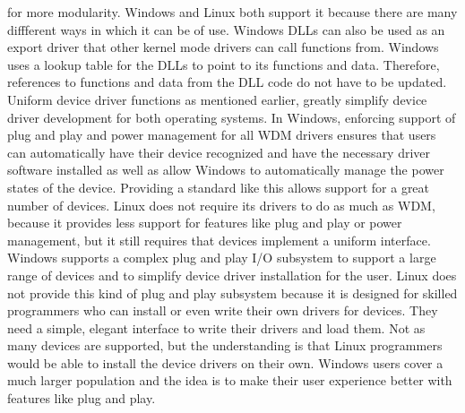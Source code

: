 \documentclass[letterpaper,10pt,titlepage]{article}
\begin{document}
for more modularity. Windows and Linux both support it because there are many
diffferent ways in which it can be of use. Windows DLLs can also be used 
as an export driver that other kernel mode drivers can call functions from.
Windows uses a lookup table for the DLLs to point to its functions and data.
Therefore, references to functions and data from the DLL code do not have
to be updated. 
\\
\linebreak
Uniform device driver functions as mentioned earlier, greatly simplify 
device driver development for both operating systems. In Windows, enforcing
support of plug and play and power management for all WDM drivers ensures 
that users can automatically have their device recognized and have the 
necessary driver software installed as well as allow Windows to 
automatically manage the power states of the device. Providing a standard 
like this allows support for a great number of devices. Linux does not
require its drivers to do as much as WDM, because it provides less support for
features like plug and play or power management, but it still requires 
that devices implement a uniform interface.
\\
\linebreak
Windows supports a complex plug and play I/O subsystem to support a large 
range of devices and to simplify device driver installation for the user. 
Linux does not provide this kind of plug and play subsystem because it is 
designed for skilled programmers who can install or even write their own 
drivers for devices. They need a simple, elegant interface to write their 
drivers and load them. Not as many devices are supported, but the understanding
is that Linux programmers would be able to install the device drivers on their
own. Windows users cover a much larger population and the idea is to make
their user experience better with features like plug and play.

%
\nocite{*}
\RaggedRight


\end{document}

